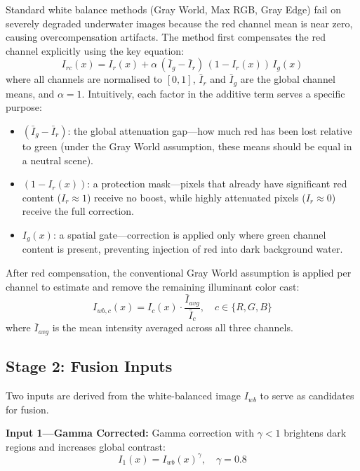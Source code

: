 \documentclass[10pt,twocolumn,letterpaper]{article}
\begin{document}
Standard white balance methods (Gray World, Max RGB, Gray Edge) fail on
severely degraded underwater images because the red channel mean is near
zero, causing overcompensation artifacts. The method first compensates the
red channel explicitly using the key equation:
\begin{equation}
  I_{rc}(x) = I_r(x) + \alpha\,(\bar{I}_g - \bar{I}_r)\,(1 - I_r(x))\,I_g(x)
  \label{eq:redcomp}
\end{equation}
where all channels are normalised to $[0,1]$, $\bar{I}_r$ and
$\bar{I}_g$ are the global channel means, and $\alpha = 1$. Intuitively,
each factor in the additive term serves a specific purpose:
\begin{itemize}
  \item $(\bar{I}_g - \bar{I}_r)$: the global attenuation gap---how much
        red has been lost relative to green (under the Gray World assumption,
        these means should be equal in a neutral scene).
  \item $(1 - I_r(x))$: a protection mask---pixels that already have
        significant red content ($I_r \approx 1$) receive no boost, while
        highly attenuated pixels ($I_r \approx 0$) receive the full
        correction.
  \item $I_g(x)$: a spatial gate---correction is applied only where green
        channel content is present, preventing injection of red into dark
        background water.
\end{itemize}

After red compensation, the conventional Gray World assumption is applied
per channel to estimate and remove the remaining illuminant color cast:
\begin{equation}
  I_{wb,c}(x) = I_c(x) \cdot \frac{\bar{I}_{avg}}{\bar{I}_c}, \quad
  c \in \{R,G,B\}
  \label{eq:grayworld}
\end{equation}
where $\bar{I}_{avg}$ is the mean intensity averaged across all three
channels.

\subsection{Stage 2: Fusion Inputs}

Two inputs are derived from the white-balanced image $I_{wb}$ to serve
as candidates for fusion.

\textbf{Input 1---Gamma Corrected:} Gamma correction with $\gamma < 1$
brightens dark regions and increases global contrast:
\begin{equation}
  I_1(x) = I_{wb}(x)^{\gamma}, \quad \gamma = 0.8
  \label{eq:gamma}
\end{equation}
\end{document}
